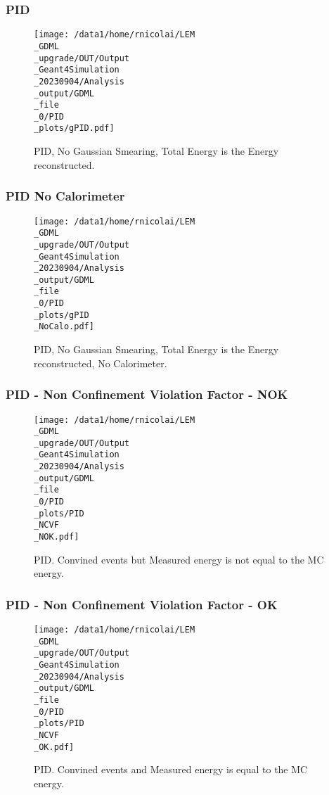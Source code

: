 \documentclass[8pt]{beamer}
\begin{document}
            \begin{frame}
                \frametitle{PID}
            
        \begin{figure}[h]
            \centering
            \texttt{[image: /data1/home/rnicolai/LEM\\\_GDML\\\_upgrade/OUT/Output\\\_Geant4Simulation\\\_20230904/Analysis\\\_output/GDML\\\_file\\\_0/PID\\\_plots/gPID.pdf]}
            \caption{PID, No Gaussian Smearing, Total Energy is the Energy reconstructed.}
        \end{figure}
        
            \end{frame}
            
            \begin{frame}
                \frametitle{PID No Calorimeter}
            
        \begin{figure}[h]
            \centering
            \texttt{[image: /data1/home/rnicolai/LEM\\\_GDML\\\_upgrade/OUT/Output\\\_Geant4Simulation\\\_20230904/Analysis\\\_output/GDML\\\_file\\\_0/PID\\\_plots/gPID\\\_NoCalo.pdf]}
            \caption{PID, No Gaussian Smearing, Total Energy is the Energy reconstructed, No Calorimeter.}
        \end{figure}
        
            \end{frame}
            
            \begin{frame}
                \frametitle{PID - Non Confinement Violation Factor - NOK}
            
        \begin{figure}[h]
            \centering
            \texttt{[image: /data1/home/rnicolai/LEM\\\_GDML\\\_upgrade/OUT/Output\\\_Geant4Simulation\\\_20230904/Analysis\\\_output/GDML\\\_file\\\_0/PID\\\_plots/PID\\\_NCVF\\\_NOK.pdf]}
            \caption{PID. Convined events but Measured energy is not equal to the MC energy.}
        \end{figure}
        
            \end{frame}
            
            \begin{frame}
                \frametitle{PID - Non Confinement Violation Factor - OK}
            
        \begin{figure}[h]
            \centering
            \texttt{[image: /data1/home/rnicolai/LEM\\\_GDML\\\_upgrade/OUT/Output\\\_Geant4Simulation\\\_20230904/Analysis\\\_output/GDML\\\_file\\\_0/PID\\\_plots/PID\\\_NCVF\\\_OK.pdf]}
            \caption{PID. Convined events and Measured energy is equal to the MC energy.}
        \end{figure}
        
            \end{frame}
            
\end{document}
